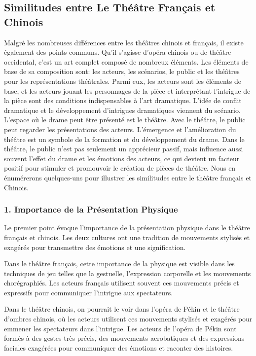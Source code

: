 \documentclass[UTF8,a4paper,12pt]{ctexart}
\numberwithin{equation}{section}
\begin{document}
\subsection{Similitudes entre Le Théâtre Français et Chinois}
Malgré les nombreuses différences entre les théâtres chinois et français, il existe également des points communs. Qu'il s'agisse d'opéra chinois ou de théâtre occidental, c'est un art complet composé de nombreux éléments. Les éléments de base de sa composition sont: les acteurs, les scénarios, le public et les théâtres pour les représentations théâtrales. Parmi eux, les acteurs sont les éléments de base, et les acteurs jouant les personnages de la pièce et interprétant l'intrigue de la pièce sont des conditions indispensables à l'art dramatique. L'idée de conflit dramatique et le développement d'intrigues dramatiques viennent du scénario. L'espace où le drame peut être présenté est le théâtre. Avec le théâtre, le public peut regarder les présentations des acteurs. L'émergence et l'amélioration du théâtre est un symbole de la formation et du développement du drame. Dans le théâtre, le public n'est pas seulement un apprécieur passif, mais influence aussi souvent l'effet du drame et les émotions des acteurs, ce qui devient un facteur positif pour stimuler et promouvoir le création de pièces de théâtre. Nous en énumérerons quelques-uns pour illustrer les similitudes entre le théâtre français et Chinois.
\subsubsection*{1. Importance de la Présentation Physique}
Le premier point évoque l'importance de la présentation physique dans le théâtre français et chinois. Les deux cultures ont une tradition de mouvements stylisés et exagérés pour transmettre des émotions et une signification.

Dans le théâtre français, cette importance de la physique est visible dans les techniques de jeu telles que la gestuelle, l'expression corporelle et les mouvements chorégraphiés. Les acteurs français utilisent souvent ces mouvements précis et expressifs pour communiquer l'intrigue aux spectateurs.

Dans le théâtre chinois, on pourrait le voir dans l'opéra de Pékin et le théâtre d'ombres chinois, où les acteurs utilisent ces mouvements stylisés et exagérés pour emmener les spectateurs dans l'intrigue. Les acteurs de l'opéra de Pékin sont formés à des gestes très précis, des mouvements acrobatiques et des expressions faciales exagérées pour communiquer des émotions et raconter des histoires.
\end{document}
